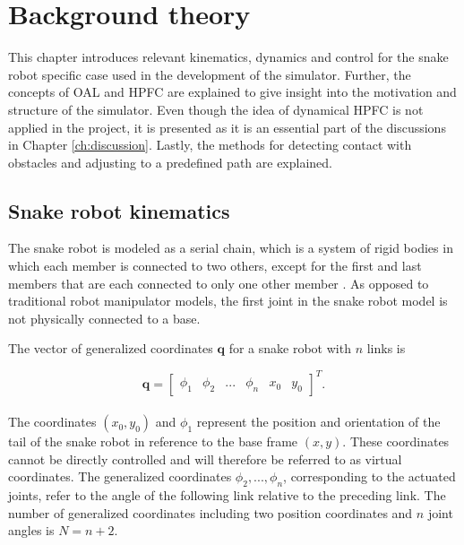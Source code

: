 \chapter{Background theory}\label{chapter:theory}

This chapter introduces relevant kinematics, dynamics and control for the snake robot specific case used in the development of the simulator. Further, the concepts of OAL and HPFC are explained to give insight into the motivation and structure of the simulator. Even though the idea of dynamical HPFC \cite{yoshikawa1987dynamic} is not applied in the project, it is presented as it is an essential part of the discussions in Chapter \ref{ch:discussion}. Lastly, the methods for detecting contact with obstacles and adjusting to a predefined path are explained.


\section{Snake robot kinematics}\label{sec:kin}


The snake robot is modeled as a serial chain, which is a system of rigid bodies in which each member is connected to two others, except for the first and last members that are each connected to only one other member \cite{waldron2016kinematics}. As opposed to traditional robot manipulator models, the first joint in the snake robot model is not physically connected to a base.


The vector of generalized coordinates $\mathbf{q}$ for a snake robot with $n$ links is

\begin{equation} \label{eq:q}
    \mathbf{q} = 
    \begin{bmatrix}
        \phi_1 & \phi_2 & ... & \phi_n & x_0 & y_0
    \end{bmatrix}^T.
\end{equation}
\\
The coordinates $(x_0, y_0)$ and $\phi_1$ represent the position and orientation of the tail of the snake robot in reference to the base frame $(x,y)$. These coordinates cannot be directly controlled and will therefore be referred to as virtual coordinates. The generalized coordinates ${\phi_2, ... ,  \phi_n}$, corresponding to the actuated joints, refer to the angle of the following link relative to the preceding link. The number of generalized coordinates including two position coordinates and $n$ joint angles is $N = n+2$.

